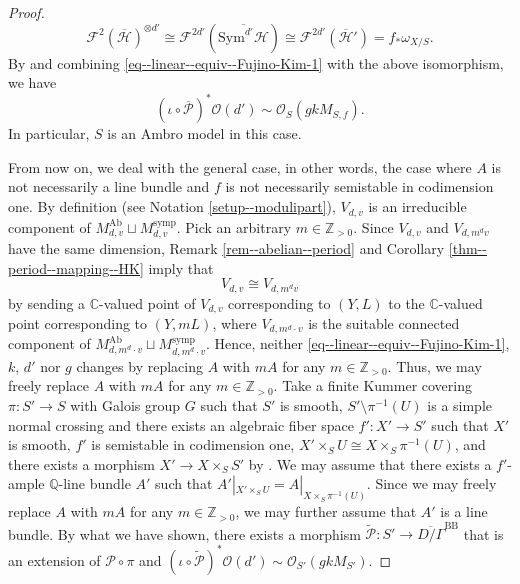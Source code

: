 \documentclass[12pt,twoside]{amsart}
\theoremstyle{definition}
\begin{document}
\begin{proof}
    \[
   \mathscr{F}^{2}(\overline{\mathcal{H}})^{\otimes d'}\cong \mathscr{F}^{2d'}(\overline{\mathrm{Sym}^{d'}\mathcal{H}})\cong \mathscr{F}^{2d'}(\overline{\mathcal{H}}')=f_*\omega_{X/S}.
   \]
  By \cite[Proposition 3.6]{fujino--canonical-certain} and combining \eqref{eq--linear--equiv--Fujino-Kim-1} with the above isomorphism, we have
  \begin{equation*}
(\iota\circ\overline{\mathcal{P}})^*\mathcal{O}(d')\sim \mathcal{O}_{S}(gkM_{S,f}).
\end{equation*}
In particular, $S$ is an Ambro model in this case.

   From now on, we deal with the general case, in other words, the case where $A$ is not necessarily a line bundle and $f$ is not necessarily semistable in codimension one.  
   By definition (see Notation \ref{setup--modulipart}), $V_{d,v}$ is an irreducible component of $M_{d,v}^{\mathrm{Ab}}\sqcup M_{d,v}^{\mathrm{symp}}$. 
   Pick an arbitrary $m\in\mathbb{Z}_{>0}$. 
   Since $V_{d,v}$ and $V_{d,m^{d} v}$ have the same dimension, Remark \ref{rem--abelian--period} and Corollary \ref{thm--period--mapping--HK} imply that
    \begin{equation*}\tag{$**$}\label{eq--mulitiple--isom}
    V_{d,v} \cong V_{d,m^d v}    
    \end{equation*}
    by sending a $\mathbb{C}$-valued point of $V_{d,v}$ corresponding to $(Y,L)$ to the $\mathbb{C}$-valued point corresponding to $(Y,mL)$, where $V_{d,m^d\cdot v}$ is the suitable connected component of $M_{d,m^d\cdot v}^{\mathrm{Ab}}\sqcup M_{d,m^d\cdot v}^{\mathrm{symp}}$. 
     Hence, neither \eqref{eq--linear--equiv--Fujino-Kim-1}, $k$, $d'$ nor $g$ changes by replacing $A$ with $mA$ for any $m\in\mathbb{Z}_{>0}$.
Thus, we may freely replace $A$ with $mA$ for any $m\in\mathbb{Z}_{>0}$.
Take a finite Kummer covering $\pi\colon S'\to S$ with Galois group $G$ such that $S'$ is smooth, $S'\setminus\pi^{-1}(U)$ is a simple normal crossing and there exists an algebraic fiber space $f'\colon X'\to S'$ such that $X'$ is smooth, $f'$ is semistable in codimension one, $X'\times_SU\cong X\times_S\pi^{-1}(U)$, and there exists a morphism $X'\to X\times_SS'$ by \cite[Theorem 4.3]{A}.
We may assume that there exists a $f'$-ample $\mathbb{Q}$-line bundle $A'$ such that $A'|_{X'\times_SU}= A|_{X\times_S\pi^{-1}(U)}$.
Since we may freely replace $A$ with $mA$ for any $m\in\mathbb{Z}_{>0}$, we may further assume that $A'$ is a line bundle.
By what we have shown, there exists a morphism $\widetilde{\mathcal{P}}\colon S'\to \overline{ D/\Gamma}^{\mathrm{BB}}$ that is an extension of $\mathcal{P}\circ\pi$ and $(\iota\circ\widetilde{\mathcal{P}})^*\mathcal{O}(d')\sim \mathcal{O}_{S'}(gkM_{S'})$.

\end{proof}
\end{document}
